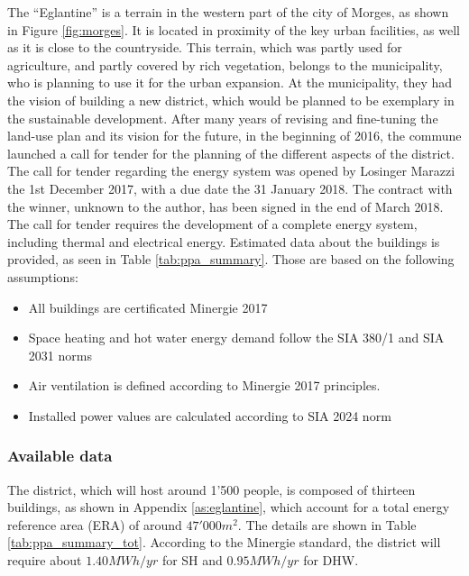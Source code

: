 \documentclass{article}
\begin{document}
The “Eglantine” is a terrain in the western part of the city of Morges, as shown in Figure \ref{fig:morges}. It is located in proximity of the key urban facilities, as well as it is close to the countryside. This terrain, which was partly used for agriculture, and partly covered by rich vegetation, belongs to the municipality, who is planning to use it for the urban expansion. At the municipality, they had the vision of building a new district, which would be planned to be exemplary in the sustainable development. After many years of revising and fine-tuning the land-use plan and its vision for the future, in the beginning of 2016, the commune launched a call for tender for the planning of the different aspects of the district. The call for tender regarding the energy system was opened by Losinger Marazzi the 1st December 2017, with a due date the 31 January 2018. The contract with the winner, unknown to the author, has been signed in the end of March 2018. \\

The call for tender requires the development of a complete energy system, including thermal and electrical energy. Estimated data about the buildings is provided, as seen in Table \ref{tab:ppa_summary}. Those are based on the following assumptions:
\begin{itemize}
    \item All buildings are certificated Minergie 2017
    \item Space heating and hot water energy demand follow the SIA 380/1 and SIA 2031 norms
    \item Air ventilation is defined according to Minergie 2017 principles.
    \item Installed power values are calculated according to SIA 2024 norm
\end{itemize}

\subsubsection{Available data}
The district, which will host around 1'500 people, is composed of thirteen buildings, as shown in Appendix \ref{as:eglantine}, which account for a total energy reference area (ERA) of around $47'000 m^{2}$. The details are shown in Table \ref{tab:ppa_summary_tot}. According to the Minergie standard, the district will require about $1.40 MWh/yr$ for SH and $0.95 MWh/yr$ for DHW.\\


\end{document}
